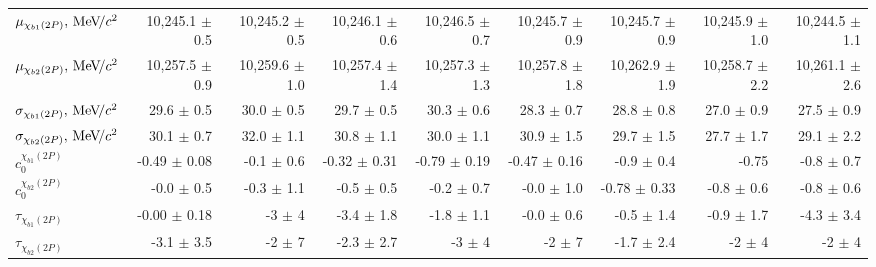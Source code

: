 \begin{table}[H]
{{\begin{tabular}{lrrrrrrrr}
\rule{0pt}{4ex}$\mu_{\chi_{b1}(2P)}, {\mathrm{\,Me\kern -0.1em V\!/}c^2}$ & 10,245.1 $\pm$ 0.5 & 10,245.2 $\pm$ 0.5 & 10,246.1 $\pm$ 0.6 & 10,246.5 $\pm$ 0.7 & 10,245.7 $\pm$ 0.9 & 10,245.7 $\pm$ 0.9 & 10,245.9 $\pm$ 1.0 & 10,244.5 $\pm$ 1.1\\
$\mu_{\chi_{b2}(2P)}, {\mathrm{\,Me\kern -0.1em V\!/}c^2}$ & 10,257.5 $\pm$ 0.9 & 10,259.6 $\pm$ 1.0 & 10,257.4 $\pm$ 1.4 & 10,257.3 $\pm$ 1.3 & 10,257.8 $\pm$ 1.8 & 10,262.9 $\pm$ 1.9 & 10,258.7 $\pm$ 2.2 & 10,261.1 $\pm$ 2.6\\

\rule{0pt}{4ex}$\sigma_{\chi_{b1}(2P)}, {\mathrm{\,Me\kern -0.1em V\!/}c^2}$ & 29.6 $\pm$ 0.5 & 30.0 $\pm$ 0.5 & 29.7 $\pm$ 0.5 & 30.3 $\pm$ 0.6 & 28.3 $\pm$ 0.7 & 28.8 $\pm$ 0.8 & 27.0 $\pm$ 0.9 & 27.5 $\pm$ 0.9\\
$\sigma_{\chi_{b2}(2P)}, {\mathrm{\,Me\kern -0.1em V\!/}c^2}$ & 30.1 $\pm$ 0.7 & 32.0 $\pm$ 1.1 & 30.8 $\pm$ 1.1 & 30.0 $\pm$ 1.1 & 30.9 $\pm$ 1.5 & 29.7 $\pm$ 1.5 & 27.7 $\pm$ 1.7 & 29.1 $\pm$ 2.2\\

\rule{0pt}{4ex}$c_0^{\chi_{b1}(2P)}$ & -0.49 $\pm$ 0.08 & -0.1 $\pm$ 0.6 & -0.32 $\pm$ 0.31 & -0.79 $\pm$ 0.19 & -0.47 $\pm$ 0.16 & -0.9 $\pm$ 0.4 & -0.75 & -0.8 $\pm$ 0.7\\
$c_0^{\chi_{b2}(2P)}$ & -0.0 $\pm$ 0.5 & -0.3 $\pm$ 1.1 & -0.5 $\pm$ 0.5 & -0.2 $\pm$ 0.7 & -0.0 $\pm$ 1.0 & -0.78 $\pm$ 0.33 & -0.8 $\pm$ 0.6 & -0.8 $\pm$ 0.6\\

\rule{0pt}{4ex}$\tau_{\chi_{b1}(2P)}$ & -0.00 $\pm$ 0.18 & -3 $\pm$ 4 & -3.4 $\pm$ 1.8 & -1.8 $\pm$ 1.1 & -0.0 $\pm$ 0.6 & -0.5 $\pm$ 1.4 & -0.9 $\pm$ 1.7 & -4.3 $\pm$ 3.4\\
$\tau_{\chi_{b2}(2P)}$ & -3.1 $\pm$ 3.5 & -2 $\pm$ 7 & -2.3 $\pm$ 2.7 & -3 $\pm$ 4 & -2 $\pm$ 7 & -1.7 $\pm$ 2.4 & -2 $\pm$ 4 & -2 $\pm$ 4\\
\bottomrule
\end{tabular}
} %

} %
\end{table}
